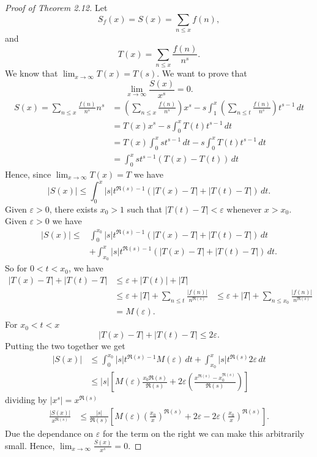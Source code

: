\documentclass[twoside, openright, fontsize=10pt, headings=big]{scrbook}
\begin{document}
\begin{proof}[Proof of Theorem 2.12]
    Let 
    \[
        S_f(x)=S(x)=\sum_{n\leq x}f(n), 
    \]
    and 
    \[
        T(x)=\sum_{n\leq x}\frac{f(n)}{n^s}.
    \]
    We know that $\lim_{x\to\infty}T(x)=T(s)$. We want to prove that 
    \[
        \lim_{x\to\infty}\frac{S(x)}{x^s}=0.
    \]
    \begin{align*}
        S(x)=\sum_{n\leq x}\frac{f(n)}{n^s}n^s&=\left(\sum_{n\leq x}\frac{f(n)}{n^s}\right)x^s-s\int_{1}^{x}\left(\sum_{n\leq t}\frac{f(n)}{n^s}\right)t^{s-1}\,dt\\
        &=T(x)x^s-s\int_{0}^{x}T(t)t^{s-1}\,dt\\
        &=T(x)\int_{0}^{x}st^{s-1}\,dt-s\int_{0}^{x}T(t)t^{s-1}\,dt\\
        &=\int_{0}^{x}st^{s-1}(T(x)-T(t))\,dt
    \end{align*}
    Hence, since $\lim_{x\to\infty}T(x)=T$ we have
    \[
        |S(x)|\leq\int_{0}^{x}|s|t^{\Re(s)-1}(|T(x)-T|+|T(t)-T|)\,dt.
    \]
    Given $\varepsilon>0$, there exists $x_0>1$ such that $|T(t)-T|<\varepsilon$ whenever $x>x_0$. Given $\varepsilon>0$ we have
    \begin{align*}
        |S(x)|\leq&\int_{0}^{x_0}|s|t^{\Re(s)-1}(|T(x)-T|+|T(t)-T|)\,dt\\
        &+\int_{x_0}^{x}|s|t^{\Re(s)-1}(|T(x)-T|+|T(t)-T|)\,dt.
    \end{align*}
    So for $0<t<x_0$, we have
    \begin{align*}
        |T(x)-T|+|T(t)-T|&\leq\varepsilon +|T(t)|+|T|\\
        &\leq\varepsilon+|T|+\sum_{n\leq t}\frac{|f(n)|}{n^{\Re(s)}}
        &\leq\varepsilon+|T|+\sum_{n\leq x_0}\frac{|f(n)|}{n^{\Re(s)}}\\
        &=M(\varepsilon).
    \end{align*}
    For $x_0<t<x$
    \[
        |T(x)-T|+|T(t)-T|\leq2\varepsilon.
    \]
    Putting the two together we get
    \begin{align*}
        |S(x)|&\leq\int_{0}^{x_0}|s|t^{\Re(s)-1}M(\varepsilon)\,dt+\int_{x_0}^{x}|s|t^{\Re(s)}2\varepsilon\,dt\\
        &\leq|s|\left[M(\varepsilon)\frac{x_0\Re(s)}{\Re(s)}+2\varepsilon\left(\frac{x^{\Re(s)}-x_0^{\Re(s)}}{\Re(s)}\right)\right]
    \end{align*}
    dividing by $|x^s|=x^{\Re(s)}$
    \begin{align*}
        \frac{|S(x)|}{x^{\Re(s)}}&\leq\frac{|s|}{\Re(s)}\left[M(\varepsilon)\left(\frac{x_0}{x}\right)^{\Re(s)}+2\varepsilon-2\varepsilon\left(\frac{x_0}{x}\right)^{\Re(s)}\right].
    \end{align*}    
    Due the dependance on $\varepsilon$ for the term on the right we can make this arbitrarily small. Hence, $\lim_{x\to\infty}\frac{S(x)}{x^s}=0$.
\end{proof}
\end{document}
